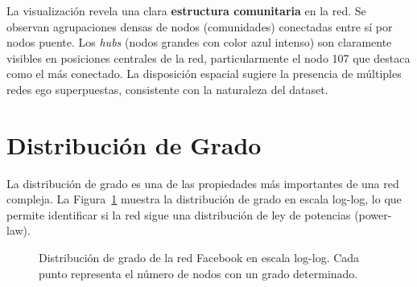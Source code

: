\documentclass[12pt,a4paper,oneside,openany]{book}
\begin{document}
\begin{hallazgobox}
La visualización revela una clara \textbf{estructura comunitaria} en la red.
Se observan agrupaciones densas de nodos (comunidades) conectadas entre sí
por nodos puente. Los \textit{hubs} (nodos grandes con color azul intenso)
son claramente visibles en posiciones centrales de la red, particularmente
el nodo 107 que destaca como el más conectado. La disposición espacial
sugiere la presencia de múltiples redes ego superpuestas, consistente con
la naturaleza del dataset.
\end{hallazgobox}

\section{Distribución de Grado}

La distribución de grado es una de las propiedades más importantes de una red
compleja. La Figura~\ref{fig:degdist} muestra la distribución de grado en escala
log-log, lo que permite identificar si la red sigue una distribución de ley de
potencias (power-law).

\begin{figure}[H]
  \centering
  \caption{Distribución de grado de la red Facebook en escala log-log.
  Cada punto representa el número de nodos con un grado determinado.}
  \label{fig:degdist}
\end{figure}
\end{document}
